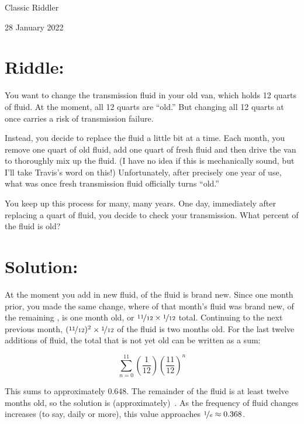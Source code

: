\documentclass{article}
\begin{document}
\pagestyle{empty} %

\begin{center}
{\LARGE Classic Riddler}

\vspace{0.15in}

{\Large 28 January 2022}
\end{center}


\section*{Riddle:}

You want to change the transmission fluid in your old van, which holds 12 quarts of fluid.
At the moment, all 12 quarts are ``old.''
But changing all 12 quarts at once carries a risk of transmission failure.

Instead, you decide to replace the fluid a little bit at a time.
Each month, you remove one quart of old fluid, add one quart of fresh fluid and then drive the van to thoroughly mix up the fluid.
(I have no idea if this is mechanically sound, but I'll take Travis's word on this!)
Unfortunately, after precisely one year of use, what was once fresh transmission fluid officially turns ``old.''

You keep up this process for many, many years.
One day, immediately after replacing a quart of fluid, you decide to check your transmission.
What percent of the fluid is old?


\section*{Solution:}

At the moment you add in new fluid,  of the fluid is brand new.
Since one month prior, you made the same change, where  of that month's fluid was brand new, of the remaining ,  is one month old, or $\nicefrac{11}{12}\times\nicefrac{1}{12}$ total.
Continuing to the next previous month, $(\nicefrac{11}{12})^2\times\nicefrac{1}{12}$ of the fluid is two months old.
For the last twelve additions of fluid, the total that is not yet old can be written as a sum:

\[
\sum_{n=0}^{11}\left(\frac{1}{12}\right)\left(\frac{11}{12}\right)^n
\]

This sums to approximately 0.648.
The remainder of the fluid is at least twelve months old, so the solution is (approximately) \,.
As the frequency of fluid changes increases (to say, daily or more), this value approaches $\nicefrac{1}{e}\approx0.368$.
\end{document}
